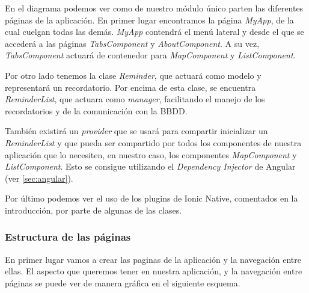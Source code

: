 En el diagrama podemos ver como de nuestro módulo único parten las diferentes páginas de la aplicación. En primer lugar encontramos la página \emph{MyApp}, de la cual cuelgan todas las demás. \emph{MyApp} contendrá el menú lateral y desde el que se accederá a las páginas \emph{TabsComponent} y \emph{AboutComponent}. A su vez, \emph{TabsComponent} actuará de contenedor para \emph{MapComponent} y \emph{ListComponent}.

Por otro lado tenemos la clase \emph{Reminder}, que actuará como modelo y representará un recordatorio. Por encima de esta clase, se encuentra \emph{ReminderList}, que actuara como \emph{manager}, facilitando el manejo de los recordatorios y de la comunicación con la \gls{BBDD}.

También existirá un \emph{provider} que se usará para compartir inicializar un \emph{ReminderList} y que pueda ser compartido por todos los componentes de nuestra aplicación que lo necesiten, en nuestro caso, los componentes \emph{MapComponent} y \emph{ListComponent}. Esto se consigue utilizando el \emph{Dependency Injector} de Angular (ver \ref{sec:angular}).

Por último podemos ver el uso de los plugins de Ionic Native, comentados en la introducción, por parte de algunas de las clases.

\subsubsection{Estructura de las páginas}

En primer lugar vamos a crear las paginas de la aplicación y la navegación entre ellas. El aspecto que queremos tener en nuestra aplicación, y la navegación entre páginas se puede ver de manera gráfica en el siguiente esquema.

